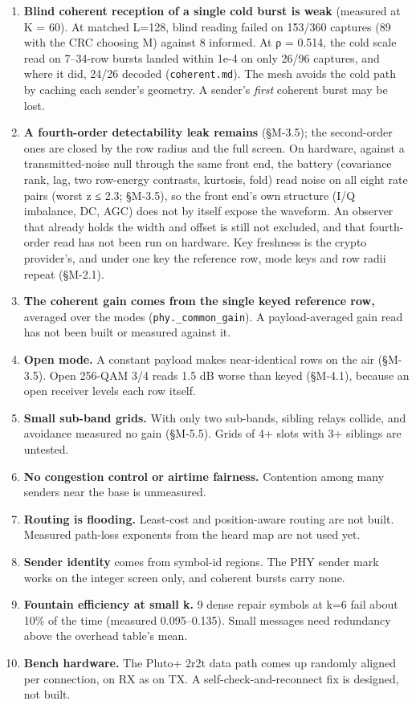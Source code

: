 \documentclass[10pt,letterpaper,twocolumn]{article}
\begin{document}
\begin{enumerate}
\item
  \textbf{Blind coherent reception of a single cold burst is weak} (measured at K = 60). At matched L=128, blind reading failed on 153/360 captures (89 with the CRC choosing M) against 8 informed. At ρ = 0.514, the cold scale read on 7--34-row bursts landed within 1e-4 on only 26/96 captures, and where it did, 24/26 decoded (\texttt{coherent.\allowbreak{}md}). The mesh avoids the cold path by caching each sender's geometry. A sender's \emph{first} coherent burst may be lost.
\item
  \textbf{A fourth-order detectability leak remains} (§M-3.5); the second-order ones are closed by the row radius and the full screen. On hardware, against a transmitted-noise null through the same front end, the battery (covariance rank, lag, two row-energy contrasts, kurtosis, fold) read noise on all eight rate pairs (worst \textbar z\textbar{} ≤ 2.3; §M-3.5), so the front end's own structure (I/Q imbalance, DC, AGC) does not by itself expose the waveform. An observer that already holds the width and offset is still not excluded, and that fourth-order read has not been run on hardware. Key freshness is the crypto provider's, and under one key the reference row, mode keys and row radii repeat (§M-2.1).
\item
  \textbf{The coherent gain comes from the single keyed reference row,} averaged over the modes (\texttt{phy.\allowbreak{}\_\allowbreak{}common\_\allowbreak{}gain}). A payload-averaged gain read has not been built or measured against it.
\item
  \textbf{Open mode.} A constant payload makes near-identical rows on the air (§M-3.5). Open 256-QAM 3/4 reads 1.5 dB worse than keyed (§M-4.1), because an open receiver levels each row itself.
\item
  \textbf{Small sub-band grids.} With only two sub-bands, sibling relays collide, and avoidance measured no gain (§M-5.5). Grids of 4+ slots with 3+ siblings are untested.
\item
  \textbf{No congestion control or airtime fairness.} Contention among many senders near the base is unmeasured.
\item
  \textbf{Routing is flooding.} Least-cost and position-aware routing are not built. Measured path-loss exponents from the heard map are not used yet.
\item
  \textbf{Sender identity} comes from symbol-id regions. The PHY sender mark works on the integer screen only, and coherent bursts carry none.
\item
  \textbf{Fountain efficiency at small k.} 9 dense repair symbols at k=6 fail about 10\% of the time (measured 0.095--0.135). Small messages need redundancy above the overhead table's mean.
\item
  \textbf{Bench hardware.} The Pluto+ 2r2t data path comes up randomly aligned per connection, on RX as on TX. A self-check-and-reconnect fix is designed, not built.
\end{enumerate}
\end{document}
